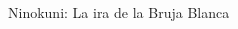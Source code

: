 \begin{frame}{Ninokuni: La ira de la Bruja Blanca}
\begin{columns}
    \begin{column}{0.35\textwidth}
    \end{column}

\end{columns}
\end{frame}

